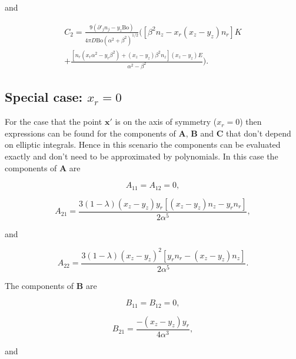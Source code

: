 \documentclass[12pt]{article}
\begin{document}
and 

\begin{align}
\label{equ:C2_comp}
C_{2} = \frac{9 (\partial'_{j} n_{j} - y_{z} \text{Bo})}{4 \pi D \text{Bo} (\alpha^{2} + \beta^{2})^{1/2}}  \bigg( [\beta^{2} n_{z} - x_{r} (x_{z} - y_{z}) n_{r}] K \nonumber \\
+ \frac{[n_{r} (x_{r} \alpha^{2} - y_{r} \beta^{2}) + (x_{z} - y_{z}) \beta^{2} n_{z}] (x_{z} - y_{z}) E}{\alpha^{2} - \beta^{2}}\bigg).
\end{align}

\subsection{Special case: $x_{r} = 0$}
\label{subapp:spec_case}

For the case that the point $\boldsymbol{x'}$ is on the axis of symmetry ($x_{r} = 0$) then expressions can be found for the components of $\boldsymbol{A}$, $\boldsymbol{B}$ and $\boldsymbol{C}$ that don't depend on elliptic integrals. Hence in this scenario the components can be evaluated exactly and don't need to be approximated by polynomials. In this case the components of $\boldsymbol{A}$ are

\begin{equation}
\label{equ:A11_spec}
A_{11} = A_{12} = 0,
\end{equation}

\begin{equation}
\label{equ:A21_spec}
A_{21} = \frac{3 (1 - \lambda) (x_{z} - y_{z}) y_{r} [(x_{z} - y_{z}) n_{z} - y_{r} n_{r}]}{2 \alpha^{5}},
\end{equation}

and

\begin{equation}
\label{equ:A22_spec}
A_{22} = \frac{3 (1 - \lambda) (x_{z} - y_{z})^{2} [y_{r} n_{r} - (x_{z} - y_{z}) n_{z}]}{2 \alpha^{5}}.
\end{equation}

The components of $\boldsymbol{B}$ are

\begin{equation}
\label{equ:B11_spec}
B_{11} = B_{12} = 0,
\end{equation}

\begin{equation}
\label{equ:B21_spec}
B_{21} = \frac{-(x_{z} - y_{z}) y_{r}}{4 \alpha^{3}},
\end{equation}

and
\end{document}
